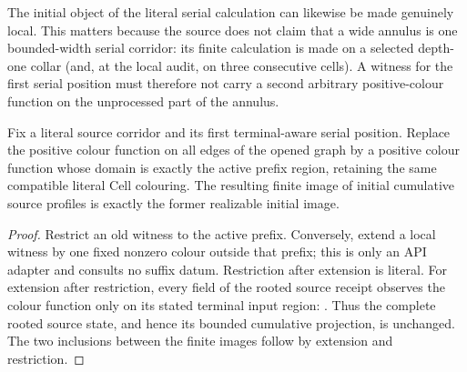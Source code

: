 The initial object of the literal serial calculation can likewise be made
genuinely local.  This matters because the source does not claim that a wide
annulus is one bounded-width serial corridor: its finite calculation is made
on a selected depth-one collar (and, at the local audit, on three consecutive
cells).  A witness for the first serial position must therefore not carry a
second arbitrary positive-colour function on the unprocessed part of the
annulus.

\begin{proposition}
\label{prop:serial-initial-prefix-local}
Fix a literal source corridor and its first terminal-aware serial position.
Replace the positive colour function on all edges of the opened graph by a
positive colour function whose domain is exactly the active prefix region,
retaining the same compatible literal Cell colouring.  The resulting finite
image of initial cumulative source profiles is exactly the former realizable
initial image.
\end{proposition}

\begin{proof}
Restrict an old witness to the active prefix.  Conversely, extend a local
witness by one fixed nonzero colour outside that prefix; this is only an API
adapter and consults no suffix datum.  Restriction after extension is literal.
For extension after restriction, every field of the rooted source receipt
observes the colour function only on its stated terminal input region:
.
Thus the complete rooted source state, and hence its bounded cumulative
projection, is unchanged.  The two inclusions between the finite images follow
by extension and restriction.
\end{proof}

